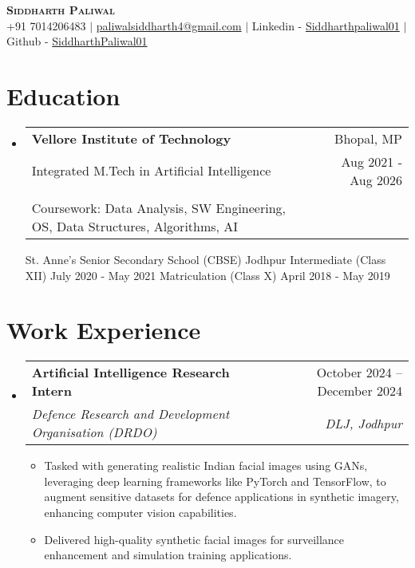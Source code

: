\documentclass[letterpaper,11pt]{article}
\makeatletter
\newcommand{\resumeItem}[1]{
  \item\small{
    {#1 \vspace{-2pt}}
  }
}
\newcommand{\resumeSubheading}[4]{
  \vspace{-2pt}\item
    \begin{tabular*}{0.97\textwidth}[t]{l@{\extracolsep{\fill}}r}
      \textbf{#1} & #2 \\
      \textit{\small#3} & \textit{\small #4} \\
    \end{tabular*}\vspace{-7pt}
}
\newcommand{\educationEntry}[6]{
  \vspace{-2pt}\item
    \begin{tabular*}{0.97\textwidth}[t]{l@{\extracolsep{\fill}}r}
      \textbf{#1} & \small{#2} \\
      \small{#3} & \small{#4} \\
      \small{#5} & \small{#6} \\
    \end{tabular*}\vspace{-7pt}
}
\newcommand{\resumeSubHeadingListStart}{\begin{itemize}[leftmargin=0.15in, label={}]}
\newcommand{\resumeSubHeadingListEnd}{\end{itemize}}
\newcommand{\resumeItemListStart}{\begin{itemize}}
\newcommand{\resumeItemListEnd}{\end{itemize}\vspace{-5pt}}
\makeatother
\begin{document}
\begin{center}
    \textbf{\Huge \scshape Siddharth Paliwal} \\ \vspace{1pt}
    \small +91 7014206483 $|$ \href{mailto:paliwalsiddharth4@gmail.com}{{paliwalsiddharth4@gmail.com}} $|$ 
    {\color{black}Linkedin} - \href{https://www.linkedin.com/in/siddharthpaliwal01/}{{Siddharthpaliwal01}} $|$
    {\color{black}Github} - \href{https://github.com/SiddharthPaliwal01}{{SiddharthPaliwal01}}
\end{center}

\section{Education}
  \resumeSubHeadingListStart
    \educationEntry
      {Vellore Institute of Technology}
      {Bhopal, MP}
      {Integrated M.Tech in Artificial Intelligence}
      {Aug 2021 - Aug 2026}
      {CGPA: 7.66/10 \\ Coursework: Data Analysis, SW Engineering, OS, Data Structures, Algorithms, AI}
      
    \educationEntry
      {St. Anne's Senior Secondary School (CBSE)}
      {Jodhpur}
      {Intermediate (Class XII)}
      {July 2020 - May 2021}
      {Matriculation (Class X)}
      {April 2018 - May 2019}
  \resumeSubHeadingListEnd

\section{Work Experience}
  \resumeSubHeadingListStart
    \resumeSubheading
      {Artificial Intelligence Research Intern}{October 2024 -- December 2024}
      {Defence Research and Development Organisation (DRDO)}{DLJ, Jodhpur}
      \resumeItemListStart
        \resumeItem{Tasked with generating realistic Indian facial images using GANs, leveraging deep learning frameworks like PyTorch and TensorFlow, to augment sensitive datasets for defence applications in synthetic imagery, enhancing computer vision capabilities.}
        \resumeItem{Delivered high-quality synthetic facial images for surveillance enhancement and simulation training applications.}
      \resumeItemListEnd
  \resumeSubHeadingListEnd

\end{document}
